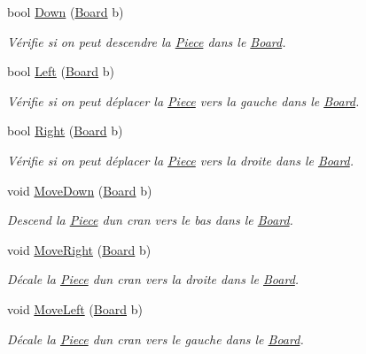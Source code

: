 \begin{DoxyCompactItemize}
bool \hyperlink{classPiece_ad48708c0bbee0b0a583f00e56808b1d2}{Down} (\hyperlink{classBoard}{Board} b)
\begin{DoxyCompactList}\small\item\em Vérifie si on peut descendre la \hyperlink{classPiece}{Piece} dans le \hyperlink{classBoard}{Board}. \end{DoxyCompactList}\item 
bool \hyperlink{classPiece_aaef48eb5277927bcacace16aaf2d9636}{Left} (\hyperlink{classBoard}{Board} b)
\begin{DoxyCompactList}\small\item\em Vérifie si on peut déplacer la \hyperlink{classPiece}{Piece} vers la gauche dans le \hyperlink{classBoard}{Board}. \end{DoxyCompactList}\item 
bool \hyperlink{classPiece_a44d684a99ea99db740b5bfa73f37ab15}{Right} (\hyperlink{classBoard}{Board} b)
\begin{DoxyCompactList}\small\item\em Vérifie si on peut déplacer la \hyperlink{classPiece}{Piece} vers la droite dans le \hyperlink{classBoard}{Board}. \end{DoxyCompactList}\item 
void \hyperlink{classPiece_a44530e200e9506f7bb4668e82dd91d54}{Move\+Down} (\hyperlink{classBoard}{Board} b)
\begin{DoxyCompactList}\small\item\em Descend la \hyperlink{classPiece}{Piece} d\textquotesingle{}un cran vers le bas dans le \hyperlink{classBoard}{Board}. \end{DoxyCompactList}\item 
void \hyperlink{classPiece_a938328bd15662dbf8d4bd66145e20e1a}{Move\+Right} (\hyperlink{classBoard}{Board} b)
\begin{DoxyCompactList}\small\item\em Décale la \hyperlink{classPiece}{Piece} d\textquotesingle{}un cran vers la droite dans le \hyperlink{classBoard}{Board}. \end{DoxyCompactList}\item 
void \hyperlink{classPiece_a08f2bd761965092bd4f8f97c81aa6af8}{Move\+Left} (\hyperlink{classBoard}{Board} b)
\begin{DoxyCompactList}\small\item\em Décale la \hyperlink{classPiece}{Piece} d\textquotesingle{}un cran vers le gauche dans le \hyperlink{classBoard}{Board}. \end{DoxyCompactList}\item 

\end{DoxyCompactItemize}
